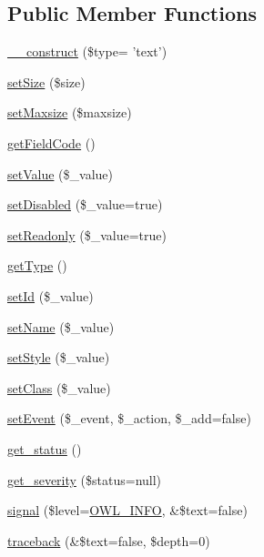 \subsection*{Public Member Functions}
\begin{DoxyCompactItemize}
\item 
\hyperlink{classFormFieldText_a19f605d6195d340c6ddf9a298706b9cd}{\_\-\_\-construct} (\$type= 'text')
\item 
\hyperlink{classFormFieldText_a045b0853ed6e7777c7f3dddbadf31f5f}{setSize} (\$size)
\item 
\hyperlink{classFormFieldText_a91b6ce8a3476c4296fbe1b0802e70984}{setMaxsize} (\$maxsize)
\item 
\hyperlink{classFormFieldText_aebbf56aba1fd099619a360ac259633fa}{getFieldCode} ()
\item 
\hyperlink{classFormField_a465ff61e290d82be96bb793c3a14b3e7}{setValue} (\$\_\-value)
\item 
\hyperlink{classFormField_a9fa2c828eaf98154edfaa2e755657117}{setDisabled} (\$\_\-value=true)
\item 
\hyperlink{classFormField_a6eabbb35d24b1698ea25b66ddfd88a64}{setReadonly} (\$\_\-value=true)
\item 
\hyperlink{classFormField_a1f64b737bccb6b2827f8c5665b9920c7}{getType} ()
\item 
\hyperlink{classBaseElement_a0c1ce3d1684ecb78960cf7a97278494e}{setId} (\$\_\-value)
\item 
\hyperlink{classBaseElement_a39bafb3609d10048920c20242c2a04c5}{setName} (\$\_\-value)
\item 
\hyperlink{classBaseElement_a6b2b9ff69f6e92db82f91d9c55cda697}{setStyle} (\$\_\-value)
\item 
\hyperlink{classBaseElement_af6597b30fa9798878f6290271043dfa2}{setClass} (\$\_\-value)
\item 
\hyperlink{classBaseElement_ad5789f45f16aaa144716ee8558069c31}{setEvent} (\$\_\-event, \$\_\-action, \$\_\-add=false)
\item 
\hyperlink{class__OWL_a99ec771fa2c5c279f80152cc09e489a8}{get\_\-status} ()
\item 
\hyperlink{class__OWL_adf9509ef96858be7bdd9414c5ef129aa}{get\_\-severity} (\$status=null)
\item 
\hyperlink{class__OWL_a51ba4a16409acf2a2f61f286939091a5}{signal} (\$level=\hyperlink{owl_8severitycodes_8php_a139328861128689f2f4def6a399d9057}{OWL\_\-INFO}, \&\$text=false)
\item 
\hyperlink{class__OWL_aa29547995d6741b7d2b90c1d4ea99a13}{traceback} (\&\$text=false, \$depth=0)
\end{DoxyCompactItemize}
